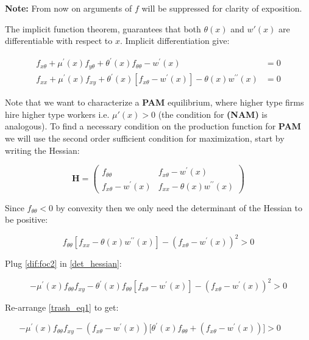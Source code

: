 \documentclass[12pt]{article}
\theoremstyle{definition}
\begin{document}
\textbf{Note:} From now on arguments of $f$ will be suppressed for clarity of exposition.

The implicit function theorem, guarantees that both $\theta(x)$ and $w'(x)$ are differentiable with respect to $x$. Implicit differentiation give:

\begin{subequations}
\label{dif:foc}
\begin{align}
f_{x \theta}+\mu^{\prime}(x) f_{y \theta}+\theta^{\prime}(x) f_{\theta \theta}-w^{\prime}(x) &=0\label{dif:foc1}  \\
f_{x x} + \mu^{\prime}(x) f_{x y} + \theta^{\prime}(x)\left[f_{x \theta}-w^{\prime}(x)\right]-\theta(x) w^{\prime \prime}(x) &=0 \label{dif:foc2}
\end{align}
\end{subequations}

Note that we want to characterize a \textbf{PAM} equilibrium, where higher type firms hire higher type workers i.e. $\mu'(x)>0$ (the condition for \textbf{(NAM)} is analogous). To find a necessary condition on the production function for \textbf{PAM} we will use the second order sufficient condition for maximization, start by writing the Hessian:


$$\mathbf{H}=\left(\begin{array}{cc}
f_{\theta \theta} & f_{x \theta}-w^{\prime}(x) \\
f_{x \theta}-w^{\prime}(x) & f_{x x}-\theta(x) w^{\prime \prime}(x)
\end{array}\right)$$

Since $f_{\theta \theta} < 0$ by convexity then we only need the determinant of the Hessian to be positive: 

\begin{equation}
f_{\theta \theta}\left[f_{x x}-\theta(x)  w^{\prime \prime}(x)\right]-\left(f_{x \theta}-w^{\prime}(x)\right)^{2} > 0 \label{det_hessian}
\end{equation}


Plug \eqref{dif:foc2} in \eqref{det_hessian}:

\begin{equation}
-\mu^{\prime}(x) f_{\theta \theta}f_{x y}-\theta^{\prime}(x) f_{\theta \theta}\left[f_{x \theta}-w^{\prime}(x)\right]-\left(f_{x \theta}-w^{\prime}(x)\right)^{2} > 0 \label{trash_eq1}
\end{equation}

Re-arrange \eqref{trash_eq1} to get:

\begin{equation}
-\mu^{\prime}(x) f_{\theta \theta}f_{x y}-\left(f_{x \theta}-w^{\prime}(x)\right)\Big[\theta^{\prime}(x) f_{\theta \theta}+\left(f_{x \theta}-w^{\prime}(x)\right)\Big] > 0 \qquad \label{trash_eq2}
\end{equation}
\end{document}
